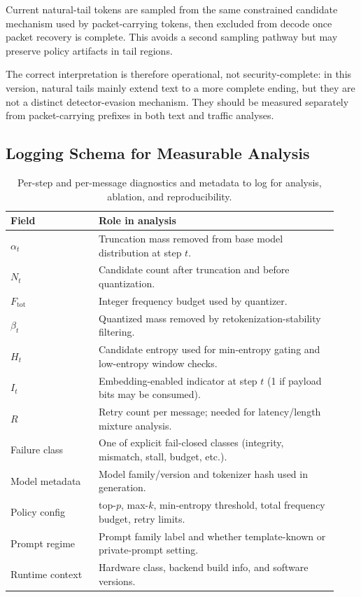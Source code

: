 Current natural-tail tokens are sampled from the same constrained candidate mechanism used by packet-carrying tokens, then excluded from decode once packet recovery is complete. This avoids a second sampling pathway but may preserve policy artifacts in tail regions.

The correct interpretation is therefore operational, not security-complete:
in this version, natural tails mainly extend text to a more complete ending, but they are not a distinct detector-evasion mechanism. They should be measured separately from packet-carrying prefixes in both text and traffic analyses.

\subsection{Logging Schema for Measurable Analysis}

\begin{table}[t]
\caption{Per-step and per-message diagnostics and metadata to log for analysis, ablation, and reproducibility.}
\label{tab:analysis-logs}
\begin{tabular}{p{0.25\linewidth}p{0.68\linewidth}}
\toprule
Field & Role in analysis \\
\midrule
$\alpha_t$ & Truncation mass removed from base model distribution at step $t$. \\
$N_t$ & Candidate count after truncation and before quantization. \\
$F_{\mathrm{tot}}$ & Integer frequency budget used by quantizer. \\
$\beta_t$ & Quantized mass removed by retokenization-stability filtering. \\
$H_t$ & Candidate entropy used for min-entropy gating and low-entropy window checks. \\
$I_t$ & Embedding-enabled indicator at step $t$ (1 if payload bits may be consumed). \\
$R$ & Retry count per message; needed for latency/length mixture analysis. \\
Failure class & One of explicit fail-closed classes (integrity, mismatch, stall, budget, etc.). \\
Model metadata & Model family/version and tokenizer hash used in generation. \\
Policy config & top-$p$, max-$k$, min-entropy threshold, total frequency budget, retry limits. \\
Prompt regime & Prompt family label and whether template-known or private-prompt setting. \\
Runtime context & Hardware class, backend build info, and software versions. \\
\bottomrule
\end{tabular}
\end{table}

